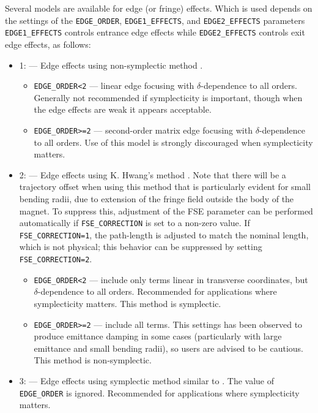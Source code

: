 Several models are available for edge (or fringe) effects. Which is used depends on the
settings of the \verb|EDGE_ORDER|, \verb|EDGE1_EFFECTS|, and \verb|EDGE2_EFFECTS| parameters
\verb|EDGE1_EFFECTS| controls entrance edge effects while \verb|EDGE2_EFFECTS| controls exit edge effects,
as follows:
\begin{itemize}
  \item 1: --- Edge effects using non-symplectic method \cite{KLBrown}. 
    \begin{itemize}
      \item \verb|EDGE_ORDER<2| --- linear edge focusing with $\delta$-dependence to all orders. Generally not recommended
        if symplecticity is important, though when the edge effects are weak it appears acceptable.
      \item \verb|EDGE_ORDER>=2| --- second-order matrix edge focusing with $\delta$-dependence to all orders. Use of this
        model is strongly discouraged when symplecticity matters.
    \end{itemize}              
  \item 2: --- Edge effects using K. Hwang's method \cite{KHwang}. Note that there will be a
  trajectory offset when using this method that is particularly evident for small bending radii, due to extension of the
  fringe field outside the body of the magnet. To suppress this, adjustment of the FSE parameter can be performed automatically 
  if \verb|FSE_CORRECTION| is set to a non-zero value. If \verb|FSE_CORRECTION=1|, the path-length is adjusted to match the nominal
  length, which is not physical; this behavior can be suppressed by setting \verb|FSE_CORRECTION=2|.
    \begin{itemize}
      \item \verb|EDGE_ORDER<2| --- include only terms linear in transverse coordinates, but $\delta$-dependence to all orders.
        Recommended for applications where symplecticity matters. This method is symplectic. 
      \item \verb|EDGE_ORDER>=2| --- include all terms. This settings has been observed to produce emittance damping in some cases
        (particularly with large emittance and small bending radii), so users are advised to be cautious. 
        This method is non-symplectic.
    \end{itemize}              
  \item 3: --- Edge effects using symplectic method similar to \cite{KLBrown}. The value of \verb|EDGE_ORDER| is ignored.
        Recommended for applications where symplecticity matters.

\end{itemize}
